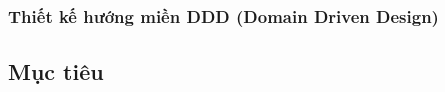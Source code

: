 \subsubsection{Thiết kế hướng miền DDD (Domain Driven Design)}










\lipsum[1]


\subsection{Mục tiêu}


\lipsum[1]
